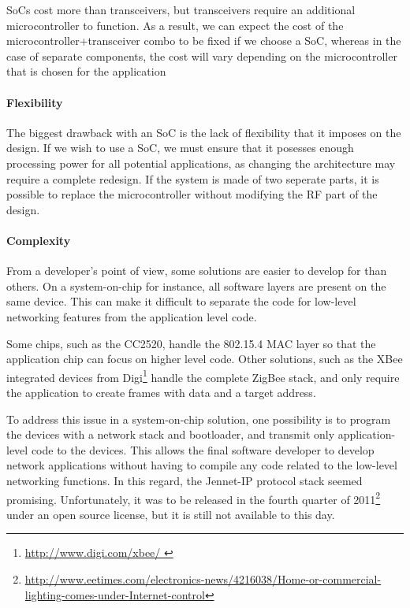 SoCs cost more than transceivers, but transceivers require an additional
microcontroller to function. As a result, we can expect the cost of the
microcontroller+transceiver combo to be fixed if we choose a SoC, whereas in the
case of separate components, the cost will vary depending on the microcontroller
that is chosen for the application

\paragraph{Flexibility} 

The biggest drawback with an SoC is the lack of flexibility that it imposes on
the design. If we wish to use a SoC, we must ensure that it posesses enough
processing power for all potential applications, as changing the architecture
may require a complete redesign.  If the system is made of two seperate parts,
it is possible to replace the microcontroller without modifying the RF part of
the design.

\paragraph{Complexity} 

From a developer's point of view, some solutions are easier to develop for than
others. On a system-on-chip for instance, all software layers are present on the
same device. This can make it difficult to separate the code for low-level
networking features from the application level code.

Some chips, such as the CC2520, handle the 802.15.4 MAC layer so that the
application chip can focus on higher level code. Other solutions, such as the
XBee integrated devices from Digi\footnote{ \url{ http://www.digi.com/xbee/ }}
handle the complete ZigBee stack, and only require the application to create
frames with data and a target address.

To address this issue in a system-on-chip solution, one possibility is to
program the devices with a network stack and bootloader, and transmit only
application-level code to the devices. This allows the final software developer
to develop network applications without having to compile any code related to
the low-level networking functions. In this regard, the Jennet-IP protocol stack
seemed promising. Unfortunately, it was to be released in the fourth quarter of
2011\footnote{ \url{
http://www.eetimes.com/electronics-news/4216038/Home-or-commercial-lighting-comes-under-Internet-control}
} under an open source license, but it is still not available to this day.

